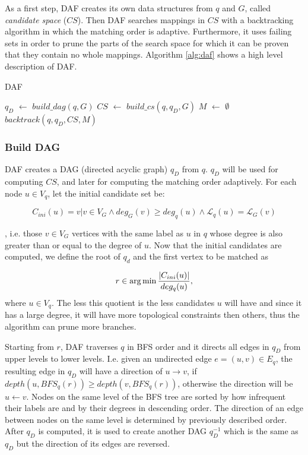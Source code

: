 As a first step, DAF creates its own data structures from $q$ and $G$, called \emph{candidate space} ($CS$).
Then DAF searches mappings in $CS$ with a backtracking algorithm in which the matching order is adaptive.
Furthermore, it uses failing sets in order to prune the parts of the search space for which it can be
proven that they contain no whole mappings. Algorithm \ref{alg:daf} shows a high level description of DAF.

\begin{algorithm}[h]
    \caption{DAF}
    \label{alg:daf}    
    \SetAlgoLined\DontPrintSemicolon
    \nl $q_D$ $\gets$ $build\_dag(q, G)$\;
    \nl $CS$ $\gets$ $build\_cs(q, q_D, G)$\;
    \nl $M$ $\gets$ $\emptyset$\;
    \nl $backtrack(q, q_D, CS, M)$\;    
\end{algorithm}

\subsubsection{Build DAG}

DAF creates a DAG (directed acyclic graph) $q_D$ from $q$. $q_D$ will be used for computing $CS$, and later
for computing the matching order adaptively. For each node $u \in V_q$, let the initial candidate set be:

\[ C_{ini}(u) = {v | v \in V_G \land deg_G(v) \geq deg_q(u) \land \mathcal{L}_q(u) = \mathcal{L}_G(v)} \]

, i.e. those $v \in V_G$ vertices with the same label as $u$ in $q$ whose degree is also greater than or 
equal to the degree of $u$. Now that the initial candidates are computed, we define the root of $q_d$
and the first vertex to be matched as

\[ r \in \operatorname*{arg\,min} \frac{|C_{ini}(u)|}{deg_q(u)}, \] where $u \in V_q$. The less this quotient is the 
less candidates $u$ will have and since it has a large degree, it will have more topological constraints 
then others, thus the algorithm can prune more branches.

Starting from $r$, DAF traverses $q$ in BFS order and it directs all edges in $q_D$ from upper levels to
lower levels. I.e. given an undirected edge $e = (u, v) \in E_q$, the resulting edge in $q_D$ will have
a direction of $u \rightarrow v$, if $depth(u, BFS_q(r)) \geq depth(v, BFS_q(r))$, otherwise the direction
will be $u \leftarrow v$. Nodes on the same level of the BFS tree are sorted by how infrequent their labels
are and by their degrees in descending order. The direction of an edge between nodes on the same level is 
determined by previously described order. After $q_D$ is computed, it is used to create another DAG $q^{-1}_D$
which is the same as $q_D$ but the direction of its edges are reversed.

